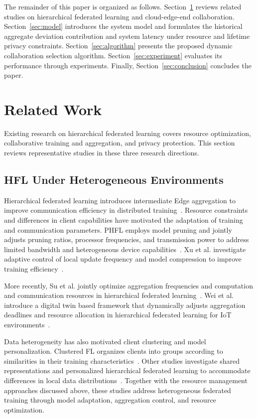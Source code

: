 \documentclass[5p,times]{elsarticle}
\theoremstyle{plain}
\theoremstyle{definition}
\theoremstyle{remark}
\begin{document}
	
	The remainder of this paper is organized as follows.
	Section~\ref{sec:related_work} reviews related studies
	on hierarchical federated learning and cloud-edge-end
	collaboration.
	Section~\ref{sec:model} introduces the system model
	and formulates the historical aggregate deviation
	contribution and system latency under resource
	and lifetime privacy constraints.
	Section~\ref{sec:algorithm} presents the proposed
	dynamic collaboration selection algorithm.
	Section~\ref{sec:experiment} evaluates its performance
	through experiments.
	Finally, Section~\ref{sec:conclusion} concludes the paper.
	
	\section{Related Work}
	\label{sec:related_work}
	Existing research on hierarchical federated
	learning covers resource optimization,
	collaborative training and aggregation,
	and privacy protection. This section
	reviews representative studies in these
	three research directions.
	\subsection{HFL Under Heterogeneous Environments}
	
	Hierarchical federated learning introduces
	intermediate Edge aggregation to improve
	communication efficiency in distributed
	training~\cite{hfl}. Resource constraints
	and differences in client capabilities have
	motivated the adaptation of training and
	communication parameters.
	PHFL employs model pruning and jointly
	adjusts pruning ratios, processor frequencies,
	and transmission power to address limited
	bandwidth and heterogeneous device
	capabilities~\cite{phfl}.
	Xu et al. investigate adaptive control of
	local update frequency and model compression
	to improve training efficiency~\cite{xu2022adaptive}.
	
	More recently, Su et al. jointly optimize
	aggregation frequencies and computation
	and communication resources in hierarchical
	federated learning~\cite{su2025adaptivehfl}.
	Wei et al. introduce a digital twin based
	framework that dynamically adjusts aggregation
	deadlines and resource allocation in hierarchical
	federated learning for IoT
	environments~\cite{wei2026dthfl}.
	
	Data heterogeneity has also motivated client
	clustering and model personalization.
	Clustered FL organizes clients into groups
	according to similarities in their training
	characteristics~\cite{sattler2020clustered}.
	Other studies investigate shared representations
	and personalized hierarchical federated learning
	to accommodate differences in local data
	distributions~\cite{collins2021exploiting,
		Personalizedhfl}.
	Together with the resource management approaches
	discussed above, these studies address
	heterogeneous federated training through
	model adaptation, aggregation control,
	and resource optimization.
	
\end{document}

